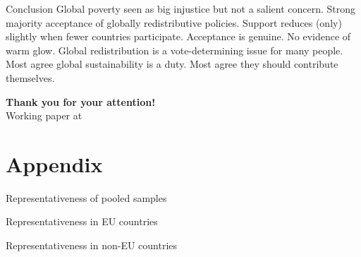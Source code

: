\documentclass[aspectratio=169,xcolor=dvipsnames, 11pt,mathserif]{beamer}
\begin{document}
\begin{frame}{Conclusion}
\bbsp
\ip Global poverty seen as big injustice but not a salient concern.
\ip Strong majority acceptance of globally redistributive policies.
\ip Support reduces (only) slightly when fewer countries participate.
\ip Acceptance is genuine. No evidence of warm glow.
\ip Global redistribution is a vote-determining issue for many people. %
\ip Most agree global sustainability is a duty.
\ip Most agree they should contribute themselves.
\ip \begin{center} \textbf{Thank you for your attention!} \\   Working paper at  \end{center}
\ee
\end{frame}

\appendix 
\section{Appendix}

\begin{frame}{Representativeness of pooled samples \hyperlink{data}{} \label{representativeness}}
    \vspace{-.6cm}
    \begin{table}[h]
        \makebox[\textwidth][c]{
            \resizebox*{!}{1.4\textheight}{
            
            }
        }
    \end{table}  
\end{frame}

\begin{frame}{Representativeness in EU countries \hyperlink{data}{} \label{representativeness}}
    \vspace{-.6cm}
    \begin{table}[h]
        \makebox[\textwidth][c]{
            \resizebox*{!}{.97\textheight}{
            
            }
        }
    \end{table}  
\end{frame}

\begin{frame}{Representativeness in non-EU countries \hyperlink{data}{} \label{representativeness}}
    \vspace{-.6cm}
    \begin{table}[h]
        \makebox[\textwidth][c]{
            \resizebox*{!}{.97\textheight}{
            
            }
        }
    \end{table}  
\end{frame}
\end{document}
